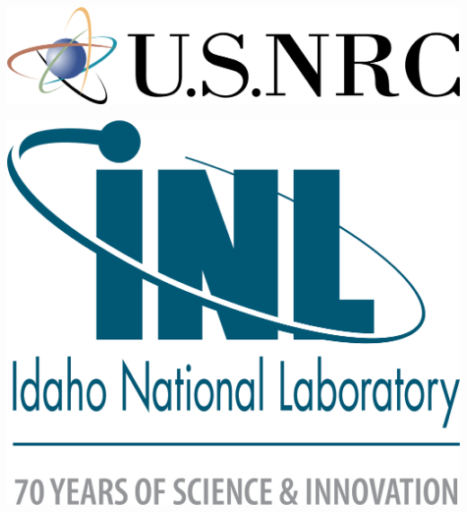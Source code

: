 {\begin{center}
\begin{minipage}{0.7\linewidth}
\begin{tcolorbox}[colback=white, colframe=black, width=\linewidth, height=.275\linewidth, boxrule=1pt]
\begin{center}
                \begin{minipage}{.3\linewidth}
                    \begin{center}
                        \includegraphics[width = \linewidth]{img/nrc.png}
                        \newline\par\vspace{-1.5em}
                        \includegraphics[height = .5\linewidth]{img/inl.png}
                    \end{center}
                \end{minipage}
            \end{center}
        \end{tcolorbox}
    \end{minipage}

    \vspace{-0.5em}
    \begin{tcolorbox}[colback=white, colframe=black, width=0.9\textwidth, arc=6pt, boxrule=1pt]
        \setlength{\columnsep}{0.5em}
        \begin{multicols}{2}
            \renewcommand{\section}[2]{} %
            
            
        \end{multicols}
    \end{tcolorbox}
\end{center}
}{
}